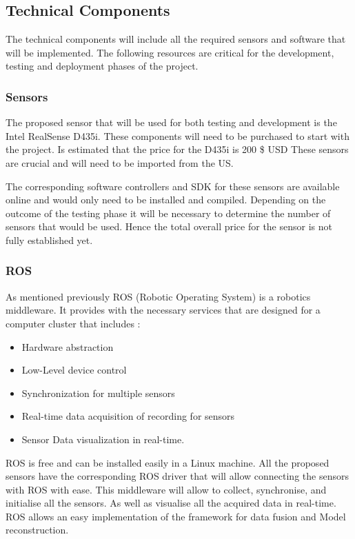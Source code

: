 \documentclass[12pt]{report}
\begin{document}
\subsection{Technical Components }
The technical components will include all the required sensors and software that will be implemented. The following resources are critical for the development, testing and deployment phases of the project. 

\subsubsection{Sensors}
The proposed sensor that will be used for both testing and development is the Intel RealSense D435i. These components will need to be purchased to start with the project. Is estimated that the price for the D435i is 200 \$ USD
These sensors are crucial and will need to be imported from the US. 

The corresponding software controllers and SDK for these sensors are available online and would only need to be installed and compiled. 
Depending on the outcome of the testing phase it will be necessary to determine the number of sensors that would be used. Hence the total overall price for the sensor is not fully established yet. 

\subsubsection{ROS}
As mentioned previously ROS (Robotic Operating System) is a robotics middleware. It provides with the necessary services that are designed for a computer cluster that includes : 
\begin{itemize}
  \item Hardware abstraction
  \item Low-Level device control
  \item Synchronization for multiple sensors
  \item Real-time data acquisition of recording for sensors
  \item Sensor Data visualization in real-time.
\end{itemize}

ROS is free and can be installed easily in a Linux machine. All the proposed sensors have the corresponding ROS driver that will allow connecting the sensors with ROS with ease. 
This middleware will allow to collect, synchronise, and initialise all the sensors. As well as visualise all the acquired data in real-time. ROS allows an easy implementation of the framework for data fusion and Model reconstruction. 
\end{document}
